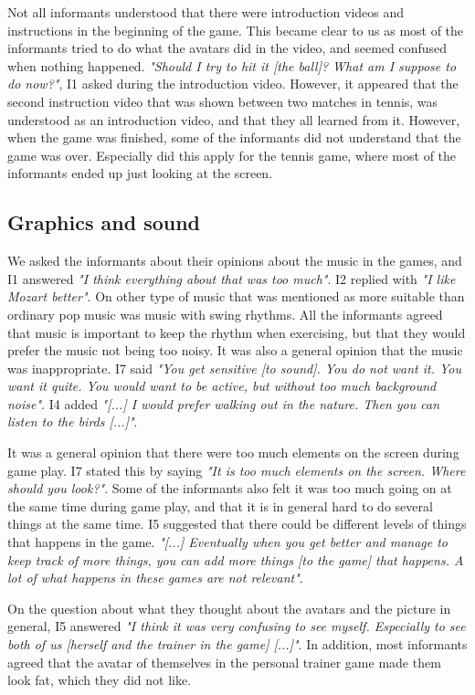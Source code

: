 Not all informants understood that there were introduction videos and instructions in the beginning of the game. This became clear to us as most of the informants tried to do what the avatars did in the video, and seemed confused when nothing happened. \emph{"Should I try to hit it [the ball]? What am I suppose to do now?"}, I1 asked during the introduction video. However, it appeared that the second instruction video that was shown between two matches in tennis, was understood as an introduction video, and that they all learned from it. However, when the game was finished, some of the informants did not understand that the game was over. Especially did this apply for the tennis game, where most of the informants ended up just looking at the screen.   

\subsection{Graphics and sound}

We asked the informants about their opinions about the music in the games, and I1 answered \emph{"I think everything about that was too much"}. I2 replied with \emph{"I like Mozart better"}. On other type of music that was mentioned as more suitable than ordinary pop music was music with swing rhythms. All the informants agreed that music is important to keep the rhythm when exercising, but that they would prefer the music not being too noisy. It was also a general opinion that the music was inappropriate.  I7 said \emph{"You get sensitive [to sound]. You do not want it. You want it quite. You would want to be active, but without too much background noise"}. I4 added \emph{"[...] I would prefer walking out in the nature. Then you can listen to the birds [...]"}.

It was a general opinion that there were too much elements on the screen during game play. I7 stated this by saying \emph{"It is too much elements on the screen. Where should you look?"}. Some of the informants also felt it was too much going on at the same time during game play, and that it is in general hard to do several things at the same time. I5 suggested that there could be different levels of things that happens in the game.  \emph{"[...] Eventually when you get better and manage to keep track of more things, you can add more things [to the game] that happens. A lot of what happens in these games are not relevant"}. 

On the question about what they thought about the avatars and the picture in general, I5 answered \emph{"I think it was very confusing to see myself. Especially to see both of us [herself and the trainer in the game] [...]"}. In addition, most informants agreed that the avatar of themselves in the personal trainer game made them look fat, which they did not like.

